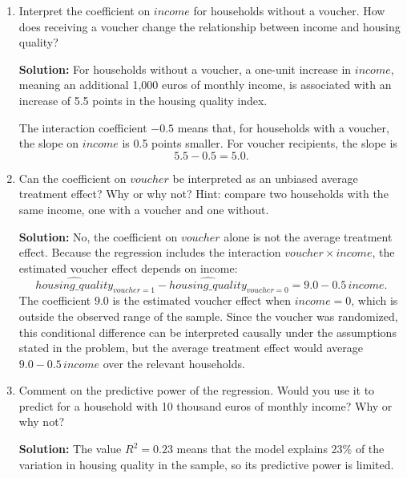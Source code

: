 \documentclass[11pt]{exam}
\begin{document}
\begin{questions}
\begin{enumerate}[leftmargin = 0.5cm, label = (\alph*), rightmargin = 0.2cm]
    \item Interpret the coefficient on $income$ for households without a voucher. How does receiving a voucher change the relationship between income and housing quality?
    \begin{solutionorbox}[9cm]
    \textbf{Solution:} For households without a voucher, a one-unit increase in $income$, meaning an additional 1,000 euros of monthly income, is associated with an increase of 5.5 points in the housing quality index.

    The interaction coefficient $-0.5$ means that, for households with a voucher, the slope on $income$ is 0.5 points smaller. For voucher recipients, the slope is
    \[
    5.5-0.5=5.0.
    \]
    \end{solutionorbox}

    \item Can the coefficient on $voucher$ be interpreted as an unbiased average treatment effect? Why or why not?
    {\footnotesize Hint: compare two households with the same income, one with a voucher and one without.}

    \begin{solutionorbox}[9cm]
    \textbf{Solution:} No, the coefficient on $voucher$ alone is not the average treatment effect. Because the regression includes the interaction $voucher\times income$, the estimated voucher effect depends on income:
    \[
    \widehat{housing\_quality}_{voucher=1}-\widehat{housing\_quality}_{voucher=0}
    =9.0-0.5\,income.
    \]
    The coefficient $9.0$ is the estimated voucher effect when $income=0$, which is outside the observed range of the sample. Since the voucher was randomized, this conditional difference can be interpreted causally under the assumptions stated in the problem, but the average treatment effect would average $9.0-0.5\,income$ over the relevant households.
    \end{solutionorbox}

    \item Comment on the predictive power of the regression. Would you use it to predict for a household with 10 thousand euros of monthly income? Why or why not?
    \begin{solutionorbox}[5cm]
    \textbf{Solution:} The value $R^2=0.23$ means that the model explains 23\% of the variation in housing quality in the sample, so its predictive power is limited.


\end{solutionorbox}
\end{enumerate}
\end{questions}
\end{document}
